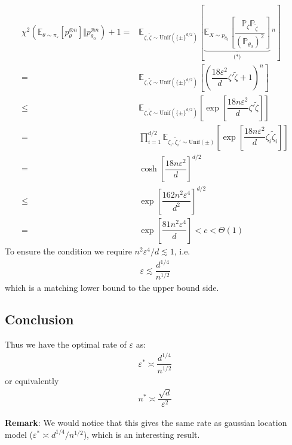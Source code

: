 \documentclass[twoside,12pt]{article}
\begin{document}
\begin{align*}
   \chi^2(\mathbb{E}_{\theta \sim \pi_\varepsilon }\left[ p_\theta ^{\otimes n} \right] \Vert p_{\theta _0}^{\otimes n} ) +1=& \mathbb{E}_{\zeta ,\tilde{\zeta } \sim \mathrm{ Unif }(\{\pm\}^{d/2}) }\left[ \underbrace{\mathbb{E}_{X\sim p_{\theta _0}}\left[ \dfrac{ \mathbb{P}_\zeta \mathbb{P}_{\tilde{\zeta }}}{ (\mathbb{P}_{\theta _0})^2 }  \right]}_{\text{(*)}}\,^n\right] \\
   =& \mathbb{E}_{\zeta ,\tilde{\zeta } \sim \mathrm{ Unif }(\{\pm\}^{d/2}) }\left[\left( \dfrac{ 18\varepsilon ^2 }{ d }\zeta '\tilde{\zeta } +1 \right)^n\right] \\
   \leq& \mathbb{E}_{\zeta ,\tilde{\zeta } \sim \mathrm{ Unif }(\{\pm\}^{d/2}) }\left[ \exp\left[ \dfrac{ 18n\varepsilon ^2 }{ d }\zeta '\tilde{\zeta } \right] \right] \\
   =& \prod_{i=1}^{d/2}\mathbb{E}_{\zeta _i,\tilde{\zeta }_i' \sim \mathrm{ Unif }(\pm) }\left[ \exp\left[ \dfrac{ 18n\varepsilon ^2 }{ d }\zeta _i\tilde{\zeta }_i  \right] \right] \\
   =& \cosh\left[ \dfrac{ 18n\varepsilon ^2 }{ d } \right]^{d/2} \\
   \leq& \exp\left[ \dfrac{ 162n^2\varepsilon ^4 }{ d^2 }  \right]^{d/2}\\
   =& \exp\left[ \dfrac{ 81n^2\varepsilon ^4 }{ d }  \right] <c <\Theta (1)
\end{align*}
To ensure the condition we require $ n^2\varepsilon ^4/d \lesssim 1 $, i.e.
\begin{align*}
   \varepsilon \lesssim \dfrac{ d^{1/4} }{ n^{1/2} } 
\end{align*}
which is a matching lower bound to the upper bound side. 



\subsection{Conclusion}

Thus we have the optimal rate of $ \varepsilon  $ as:
\begin{align*}
   \varepsilon^* \asymp \dfrac{ d^{1/4} }{ n^{1/2} } 
\end{align*}
or equivalently
\begin{align*}
   n^* \asymp \dfrac{ \sqrt{d} }{ \varepsilon ^2 } 
\end{align*}

\textbf{Remark}: We would notice that this gives the same rate as gaussian location model ($ \varepsilon ^* \asymp d^{1/4}/n^{1/2} $), which is an interesting result.
\end{document}
